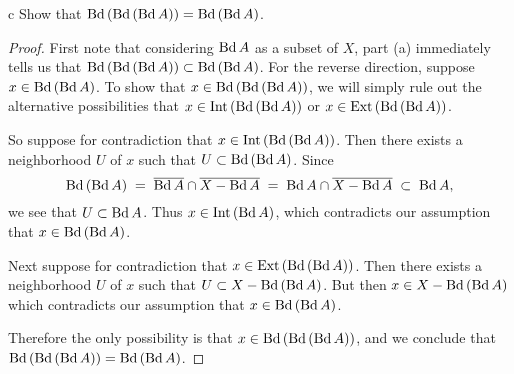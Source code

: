 \documentclass[11pt]{article}
\begin{document}
\begin{p}{c}
  Show that $\bd (\bd (\bd A)) = \bd (\bd A)$.
\end{p}
\begin{proof}
  First note that considering $\bd A$ as a subset of $X$, part (a) immediately
  tells us that $\bd (\bd (\bd A)) \subset \bd (\bd A)$. For the reverse
  direction, suppose $x \in \bd (\bd A)$. To show that $x \in \bd (\bd (\bd
  A))$, we will simply rule out the alternative possibilities that
  $x \in \intr (\bd (\bd A))$ or $x \in \extr (\bd (\bd A))$.

  So suppose for contradiction that $x \in \intr (\bd (\bd A))$. Then there
  exists a neighborhood $U$ of $x$ such that $U \subset \bd (\bd A)$. Since
  \[ \bd (\bd A) \;=\; \cl{\bd A} \cap \cl{X - \bd A} \;=\; \bd A \cap \cl{X - \bd
  A} \;\subset\; \bd A,\]
  we see that $U \subset \bd A$. Thus $x \in \intr (\bd A)$, which contradicts
  our assumption that $x \in \bd (\bd A)$.

  Next suppose for contradiction that $x \in \extr (\bd (\bd A))$. Then there
  exists a neighborhood $U$ of $x$ such that $U \subset X - \bd (\bd A)$. But
  then $x \in X - \bd (\bd A)$ which contradicts our assumption that $x \in \bd
  (\bd A)$.

  Therefore the only possibility is that $x \in \bd (\bd (\bd A))$, and we
  conclude that \\ $\bd (\bd (\bd A)) = \bd (\bd A)$.
\end{proof}
\end{document}
